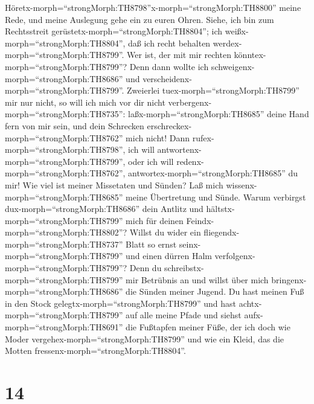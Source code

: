 Höretx-morph=``strongMorph:TH8798''x-morph=``strongMorph:TH8800'' meine
Rede, und meine Auslegung gehe ein zu euren Ohren.  Siehe,
ich bin zum Rechtsstreit gerüstetx-morph=``strongMorph:TH8804''; ich
weißx-morph=``strongMorph:TH8804'', daß ich recht behalten
werdex-morph=``strongMorph:TH8799''.  Wer ist, der mit mir
rechten könntex-morph=``strongMorph:TH8799''? Denn dann wollte ich
schweigenx-morph=``strongMorph:TH8686'' und
verscheidenx-morph=``strongMorph:TH8799''.  Zweierlei
tuex-morph=``strongMorph:TH8799'' mir nur nicht, so will ich mich vor
dir nicht verbergenx-morph=``strongMorph:TH8735'': 
laßx-morph=``strongMorph:TH8685'' deine Hand fern von mir sein, und dein
Schrecken erschreckex-morph=``strongMorph:TH8762'' mich nicht!
 Dann rufex-morph=``strongMorph:TH8798'', ich will
antwortenx-morph=``strongMorph:TH8799'', oder ich will
redenx-morph=``strongMorph:TH8762'',
antwortex-morph=``strongMorph:TH8685'' du mir!  Wie viel
ist meiner Missetaten und Sünden? Laß mich
wissenx-morph=``strongMorph:TH8685'' meine Übertretung und Sünde.
 Warum verbirgst dux-morph=``strongMorph:TH8686'' dein
Antlitz und hältstx-morph=``strongMorph:TH8799'' mich für deinen
Feindx-morph=``strongMorph:TH8802''?  Willst du wider ein
fliegendx-morph=``strongMorph:TH8737'' Blatt so ernst
seinx-morph=``strongMorph:TH8799'' und einen dürren Halm
verfolgenx-morph=``strongMorph:TH8799''?  Denn du
schreibstx-morph=``strongMorph:TH8799'' mir Betrübnis an und willst über
mich bringenx-morph=``strongMorph:TH8686'' die Sünden meiner Jugend.
 Du hast meinen Fuß in den Stock
gelegtx-morph=``strongMorph:TH8799'' und hast
achtx-morph=``strongMorph:TH8799'' auf alle meine Pfade und siehst
aufx-morph=``strongMorph:TH8691'' die Fußtapfen meiner Füße,
 der ich doch wie Moder
vergehex-morph=``strongMorph:TH8799'' und wie ein Kleid, das die Motten
fressenx-morph=``strongMorph:TH8804''.

\hypertarget{section-13}{%
\section{14}\label{section-13}}

